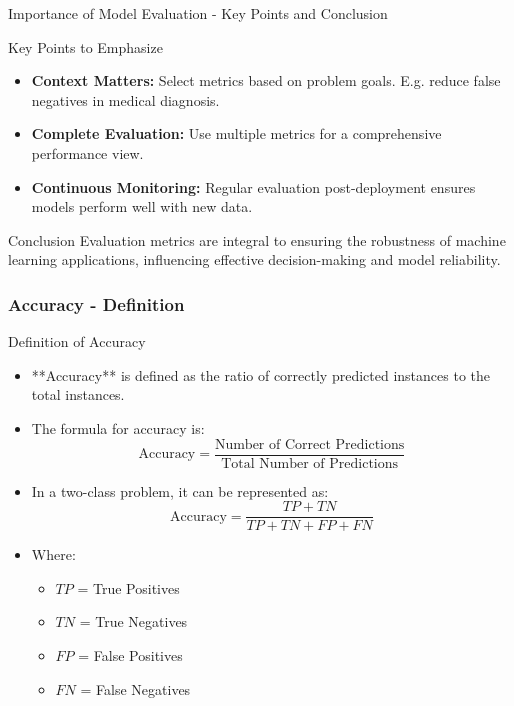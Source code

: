 \documentclass[aspectratio=169]{beamer}
\begin{document}
\begin{frame}[fragile]{Importance of Model Evaluation - Key Points and Conclusion}
    \begin{block}{Key Points to Emphasize}
        \begin{itemize}
            \item \textbf{Context Matters:} Select metrics based on problem goals. E.g. reduce false negatives in medical diagnosis.
            \item \textbf{Complete Evaluation:} Use multiple metrics for a comprehensive performance view.
            \item \textbf{Continuous Monitoring:} Regular evaluation post-deployment ensures models perform well with new data.
        \end{itemize}
    \end{block}
    
    \begin{block}{Conclusion}
        Evaluation metrics are integral to ensuring the robustness of machine learning applications, influencing effective decision-making and model reliability.
    \end{block}
\end{frame}

\begin{frame}[fragile]
    \frametitle{Accuracy - Definition}
    \begin{block}{Definition of Accuracy}
        \begin{itemize}
            \item **Accuracy** is defined as the ratio of correctly predicted instances to the total instances.
            \item The formula for accuracy is:
            \[
            \text{Accuracy} = \frac{\text{Number of Correct Predictions}}{\text{Total Number of Predictions}}
            \]
            \item In a two-class problem, it can be represented as:
            \[
            \text{Accuracy} = \frac{TP + TN}{TP + TN + FP + FN}
            \]
            \item Where:
            \begin{itemize}
                \item \( TP \) = True Positives
                \item \( TN \) = True Negatives
                \item \( FP \) = False Positives
                \item \( FN \) = False Negatives
            \end{itemize}
        \end{itemize}
    \end{block}
\end{frame}
\end{document}
